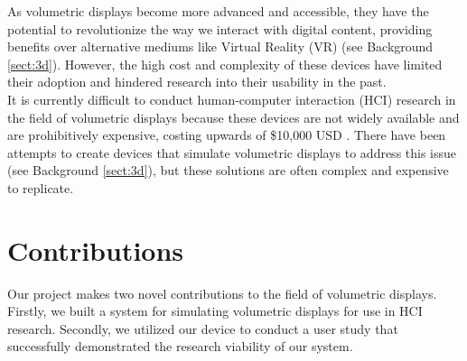 As volumetric displays become more advanced and accessible, they have the potential to revolutionize the way we interact with digital content, providing benefits over alternative mediums like Virtual Reality (VR) (see Background \ref{sect:3d}). However, the high cost and complexity of these devices have limited their adoption and hindered research into their usability in the past. \\

It is currently difficult to conduct human-computer interaction (HCI) research in the field of volumetric displays because these devices are not widely available and are prohibitively expensive, costing upwards of \$10,000 USD \cite{noauthor_products_nodate}. There have been attempts to create devices that simulate volumetric displays to address this issue (see Background \ref{sect:3d}), but these solutions are often complex and expensive to replicate.

\section{Contributions}

Our project makes two novel contributions to the field of volumetric displays. Firstly, we built a system for simulating volumetric displays for use in HCI research. Secondly, we utilized our device to conduct a user study that successfully demonstrated the research viability of our system.

